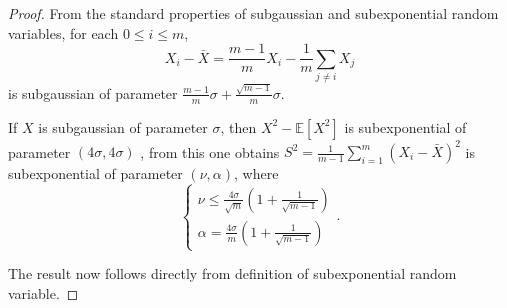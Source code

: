 \documentclass[pdflatex,sn-mathphys-num]{sn-jnl}%
\theoremstyle{thmstyleone}%
\theoremstyle{thmstyletwo}%
\theoremstyle{thmstylethree}%
\begin{document}
%	
%	
%	

\begin{proof}
	From the standard properties of subgaussian and subexponential random variables, for each $0\leq i\leq m$,
	\[X_i-\bar{X} = \frac{m-1}{m}X_i - \frac{1}{m}\sum_{j\neq i} X_j\] is subgaussian of parameter $\frac{m-1}{m}\sigma +\frac{\sqrt{m-1}}{m}\sigma$.
	
	If $X$ is subgaussian of parameter $\sigma$, then $X^2-\mathbb{E}[X^2]$ is subexponential of parameter $(4\sigma,4\sigma)$ \cite{MIT_high_dim_stats}, from this one obtains $S^2 = \frac{1}{m-1}\sum_{i=1}^{m} (X_i-\bar{X})^2$ is subexponential of parameter $(\nu, \alpha)$, where 
	\[\begin{cases}
		\nu \leq \frac{4\sigma}{\sqrt{m}}(1+\frac{1}{\sqrt{m-1}})\\
		\alpha = \frac{4\sigma}{m}(1+\frac{1}{\sqrt{m-1}})
	\end{cases}.\]
	
	The result now follows directly from definition of subexponential random variable.
\end{proof}
\end{document}
